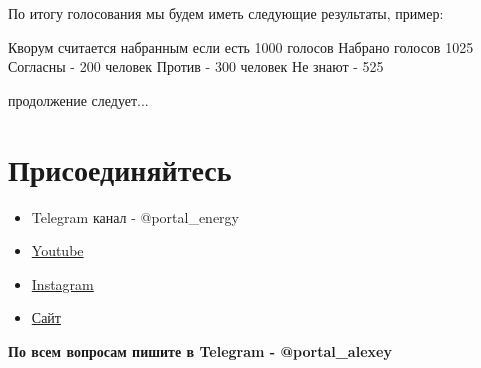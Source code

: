 \documentclass[a4paper,12pt]{report}
\begin{document}
По итогу голосования мы будем иметь следующие результаты, пример:

Кворум считается набранным если есть 1000 голосов
Набрано голосов 1025
Согласны - 200 человек
Против - 300 человек
Не знают - 525

продолжение следует...


\chapter{Присоединяйтесь}

\begin{itemize}
	\item Telegram канал - @portal\_energy
	\item \href{https://www.youtube.com/channel/UCtPxyCkz73i78F9HChlO61w}{Youtube}
	\item \href{https://www.instagram.com/petr_roadrunner/}{Instagram}
	\item \href{https://portalenergy.tech}{Сайт}
\end{itemize}

\textbf{По всем вопросам пишите в Telegram - @portal\_alexey}
\end{document}

